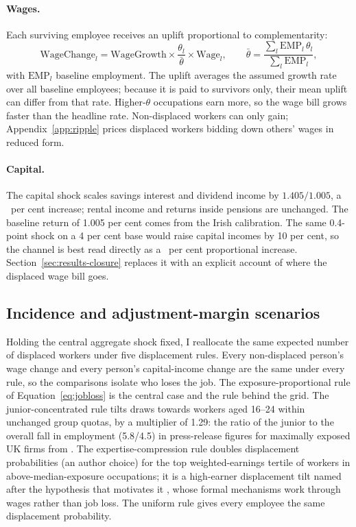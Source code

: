 \paragraph{Wages.} Each surviving employee receives an uplift proportional to complementarity:
\begin{equation}
\label{eq:wage}
\text{WageChange}_l = \text{WageGrowth} \times \frac{\theta_l}{\bar{\theta}} \times \text{Wage}_l,
\qquad
\bar{\theta} = \frac{\sum_l \text{EMP}_l \, \theta_l}{\sum_l \text{EMP}_l},
\end{equation}
with $\text{EMP}_l$ baseline employment. The uplift averages the assumed growth rate over all baseline employees; because it is paid to survivors only, their mean uplift can differ from that rate. Higher-$\theta$ occupations earn more, so the wage bill grows faster than the headline rate. Non-displaced workers can only gain; Appendix~\ref{app:ripple} prices displaced workers bidding down others' wages in reduced form.

\paragraph{Capital.} The capital shock scales savings interest and dividend income by $1.405/1.005$, a \genCapitalScalePct~per cent increase; rental income and returns inside pensions are unchanged. The baseline return of 1.005 per cent comes from the Irish calibration. The same 0.4-point shock on a 4 per cent base would raise capital incomes by 10 per cent, so the channel is best read directly as a \genCapitalScalePct~per cent proportional increase. Section~\ref{sec:results-closure} replaces it with an explicit account of where the displaced wage bill goes.

\subsection{Incidence and adjustment-margin scenarios}
\label{sec:incidence}

Holding the central aggregate shock fixed, I reallocate the same expected number of displaced workers under five displacement rules. Every non-displaced person's wage change and every person's capital-income change are the same under every rule, so the comparisons isolate who loses the job. The exposure-proportional rule of Equation~\eqref{eq:jobloss} is the central case and the rule behind the grid. The junior-concentrated rule tilts draws towards workers aged 16--24 within unchanged group quotas, by a multiplier of 1.29: the ratio of the junior to the overall fall in employment (5.8/4.5) in press-release figures for maximally exposed UK firms from \citet{kleinteeselink2025}. The expertise-compression rule doubles displacement probabilities (an author choice) for the top weighted-earnings tertile of workers in above-median-exposure occupations; it is a high-earner displacement tilt named after the hypothesis that motivates it \citep{autor2024, hosseinilichtinger2026barriers}, whose formal mechanisms work through wages rather than job loss. The uniform rule gives every employee the same displacement probability.

